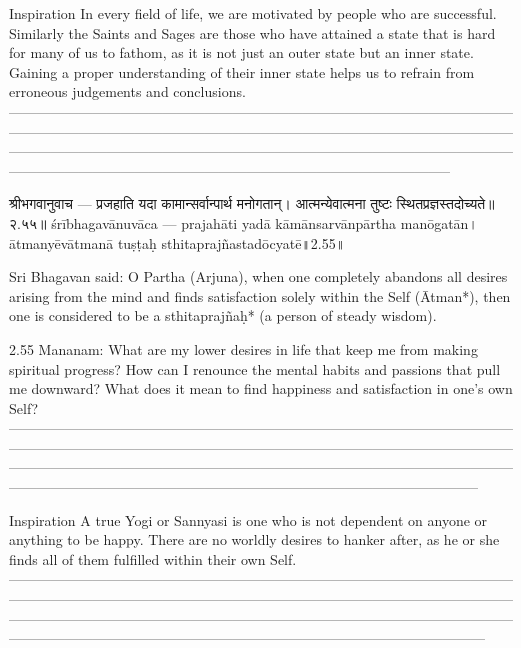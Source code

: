 Inspiration
In every field of life, we are motivated by people who are successful. Similarly the Saints and Sages are those who have attained a state that is hard for many of us to fathom, as it is not just an outer state but an inner state. Gaining a proper understanding of their inner state helps us to refrain from erroneous judgements and conclusions.
—--------------------------------------------------------------------------------------------------------------------------------------------------------------------------------------------------------------------------------------------------------------------------------------------------------------------------------------------------------------------------------------------------------------------------------



श्रीभगवानुवाच —
प्रजहाति यदा कामान्सर्वान्पार्थ मनोगतान्। 
आत्मन्येवात्मना तुष्टः स्थितप्रज्ञस्तदोच्यते॥२.५५॥
śrībhagavānuvāca —
prajahāti yadā kāmānsarvānpārtha manōgatān। 
ātmanyēvātmanā tuṣṭaḥ sthitaprajñastadōcyatē॥2.55॥

Sri Bhagavan said:
O Partha (Arjuna), when one completely abandons all desires arising from the mind and finds satisfaction solely within the Self (Ātman*), then one is considered to be a sthitaprajñaḥ* (a person of steady wisdom). 

2.55 Mananam:
What are my lower desires in life that keep me from making spiritual progress? How can I renounce the mental habits and passions that pull me downward? What does it mean to find happiness and satisfaction in one’s own Self?
—--------------------------------------------------------------------------------------------------------------------------------------------------------------------------------------------------------------------------------------------------------------------------------------------------------------------------------------------------------------------------------------------------------------------------------------
 

Inspiration
A true Yogi or Sannyasi is one who is not dependent on anyone or anything to be happy. There are no worldly desires to hanker after, as he or she finds all of them fulfilled within their own Self.
—---------------------------------------------------------------------------------------------------------------------------------------------------------------------------------------------------------------------------------------------------------------------------------------------------------------------------------------------------------------------------------------------------------------------------------------



